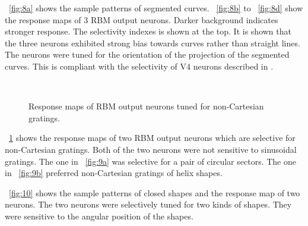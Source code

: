 \documentclass[conference]{IEEEtran}
\begin{document}
\figurename~\ref{fig:8a} shows the sample patterns of segmented curves.
\figurename~\ref{fig:8b} to \figurename~\ref{fig:8d} show the response maps of 3 RBM output neurons.
Darker background indicates stronger response.
The selectivity indexes is shown at the top.
It is shown that the three neurons exhibited strong bias towards curves rather than straight lines.
The neurons were tuned for the orientation of the projection of the segmented curves.
This is compliant with the selectivity of V4 neurons described in \cite{pasupathy1999}.

\begin{figure}[htp]
\centering
{}\\
\caption{Response maps of RBM output neurons tuned for non-Cartesian gratings.}
\label{fig:9}
\end{figure}

\figurename~\ref{fig:9} shows the response maps of two RBM output neurons
which are selective for non-Cartesian gratings.
Both of the two neurons were not sensitive to sinusoidal gratings.
The one in \figurename~\ref{fig:9a} was selective for a pair of circular sectors.
The one in \figurename~\ref{fig:9b} preferred non-Cartesian gratings of helix shapes.

\figurename~\ref{fig:10} shows the sample patterns of closed shapes and the response map of two neurons.
The two neurons were selectively tuned for two kinds of shapes.
They were sensitive to the angular position of the shapes.
\end{document}
